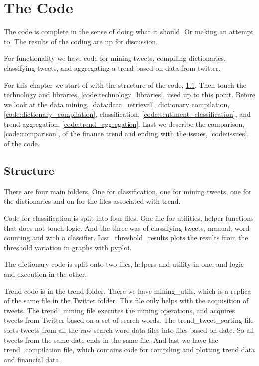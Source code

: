 \chapter{The Code}\label{code}
The code is complete in the sense of doing what it should. Or making an attempt
to. The results of the coding are up for discussion.

For functionality we have code for mining tweets, compiling dictionaries,
classifying tweets, and aggregating a trend based on data from twitter.  

For this chapter we start of with the structure of the code,
\ref{code:structure}. Then touch the technology and libraries,
\ref{code:technology_libraries}, used up to this point. Before we look at the
data mining, \ref{data:data_retrieval}, dictionary compilation,
\ref{code:dictionary_compilation}, classification,
\ref{code:sentiment_classification}, and trend aggregation,
\ref{code:trend_aggregation}. Last we describe the comparison,
\ref{code:comparison}, of the finance trend and ending with the issues,
\ref{code:issues}, of the code.  

\section{Structure}\label{code:structure}
There are four main folders. One for classification, one for mining tweets, one
for the dictionaries and on for the files associated with trend. 

Code for classification is split into four files. One file for utilities,
helper functions that does not touch logic. And the three was of classifying
tweets, manual, word counting and with a classifier. List\_threshold\_results
plots the results from the threshold variation in graphs with pyplot. 

The dictionary code is split onto two files, helpers and utility in one, and
logic and execution in the other. 

Trend code is in the trend folder. There we have mining\_utils, which is a
replica of the same file in the Twitter folder. This file only helps with the
acquisition of tweets. The trend\_mining file executes the mining operations,
and acquires tweets from Twitter based on a set of search words. The
trend\_tweet\_sorting file sorts tweets from all the raw search word data files
into files based on date. So all tweets from the same date ends in the same
file. And last we have the trend\_compilation file, which contains code for
compiling and plotting trend data and financial data.  

